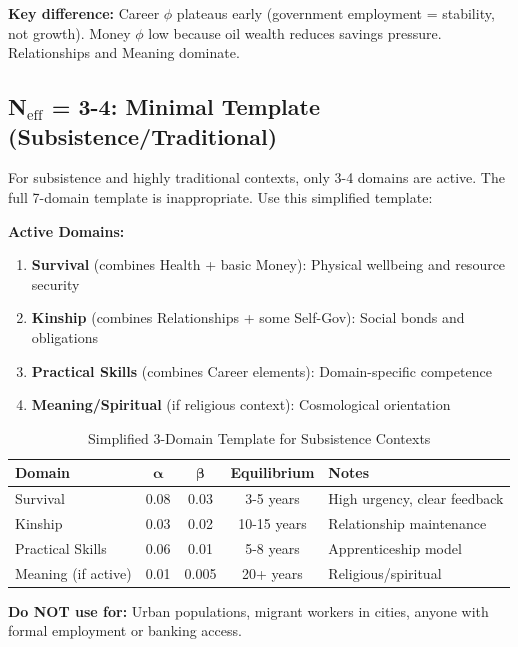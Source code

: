 \textbf{Key difference:} Career $\phi$ plateaus early (government employment = stability, not growth).
Money $\phi$ low because oil wealth reduces savings pressure. Relationships and Meaning dominate.

\subsection{N$_{\text{eff}}$ = 3-4: Minimal Template (Subsistence/Traditional)}

For subsistence and highly traditional contexts, only 3-4 domains are active. The full
7-domain template is inappropriate. Use this simplified template:

\textbf{Active Domains:}
\begin{enumerate}[nosep]
\item \textbf{Survival} (combines Health + basic Money): Physical wellbeing and resource security
\item \textbf{Kinship} (combines Relationships + some Self-Gov): Social bonds and obligations
\item \textbf{Practical Skills} (combines Career elements): Domain-specific competence
\item \textbf{Meaning/Spiritual} (if religious context): Cosmological orientation
\end{enumerate}

\begin{table}[htbp]
\centering
\caption{Simplified 3-Domain Template for Subsistence Contexts}
\label{tab:rrr-subsistence}
\renewcommand{\arraystretch}{1.3}
\small
\begin{tabular}{@{}lcccl@{}}
\toprule
\textbf{Domain} & $\boldsymbol{\alpha}$ & $\boldsymbol{\beta}$ & \textbf{Equilibrium} & \textbf{Notes} \\
\midrule
Survival & 0.08 & 0.03 & 3-5 years & High urgency, clear feedback \\
Kinship & 0.03 & 0.02 & 10-15 years & Relationship maintenance \\
Practical Skills & 0.06 & 0.01 & 5-8 years & Apprenticeship model \\
Meaning (if active) & 0.01 & 0.005 & 20+ years & Religious/spiritual \\
\bottomrule
\end{tabular}
\end{table}

\textbf{Do NOT use for:} Urban populations, migrant workers in cities, anyone with
formal employment or banking access.

